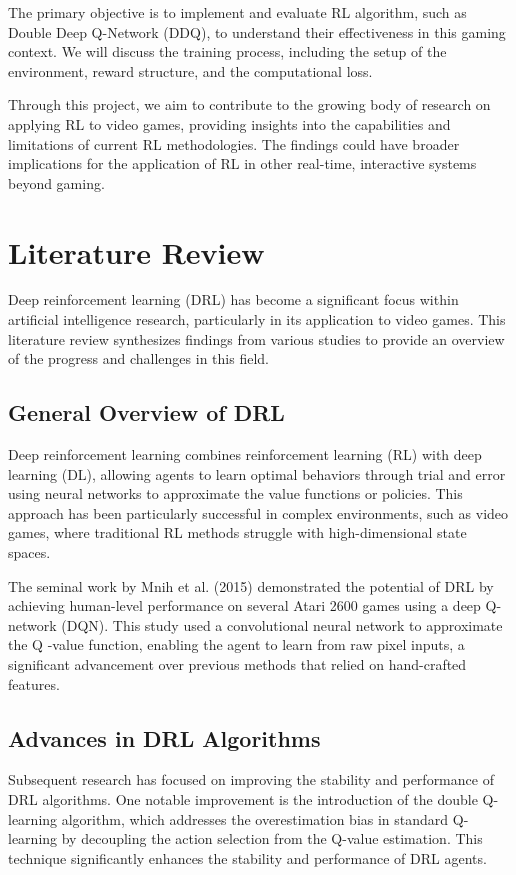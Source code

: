 \documentclass[preprint,12pt,3p,times]{elsarticle}
\begin{document}
The primary objective is to implement and evaluate RL algorithm, such as Double Deep Q-Network (DDQ)\cite{van2016deep}, to understand their effectiveness in this gaming context. We will discuss the training process, including the setup of the environment, reward structure, and the computational loss.

Through this project, we aim to contribute to the growing body of research on applying RL to video games, providing insights into the capabilities and limitations of current RL methodologies. The findings could have broader implications for the application of RL in other real-time, interactive systems beyond gaming.

\section{Literature Review}

Deep reinforcement learning (DRL) has become a significant focus within artificial intelligence research, particularly in its application to video games. This literature review synthesizes findings from various studies to provide an overview of the progress and challenges in this field.

\subsection{General Overview of DRL}
Deep reinforcement learning combines reinforcement learning (RL) with deep learning (DL), allowing agents to learn optimal behaviors through trial and error using neural networks to approximate the value functions or policies. This approach has been particularly successful in complex environments, such as video games, where traditional RL methods struggle with high-dimensional state spaces\cite{li2017deep}.

The seminal work by Mnih et al. (2015) demonstrated the potential of DRL by achieving human-level performance on several Atari 2600 games using a deep Q-network (DQN)\cite{mnih2015human}. This study used a convolutional neural network to approximate the Q -value function, enabling the agent to learn from raw pixel inputs, a significant advancement over previous methods that relied on hand-crafted features.

\subsection{Advances in DRL Algorithms}
Subsequent research has focused on improving the stability and performance of DRL algorithms. One notable improvement is the introduction of the double Q-learning algorithm, which addresses the overestimation bias in standard Q-learning by decoupling the action selection from the Q-value estimation\cite{van2016deep}. This technique significantly enhances the stability and performance of DRL agents.
\end{document}
